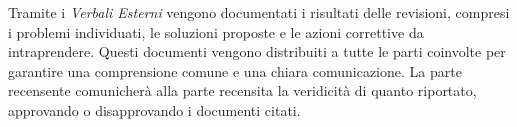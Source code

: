 Tramite i \textit{Verbali Esterni} vengono documentati i risultati delle revisioni, compresi i problemi individuati, le soluzioni proposte e le azioni correttive da intraprendere. Questi documenti vengono distribuiti a tutte le parti coinvolte per garantire una comprensione comune e una chiara comunicazione. La parte recensente comunicherà alla parte recensita la veridicità di quanto riportato, approvando o disapprovando i documenti citati.




